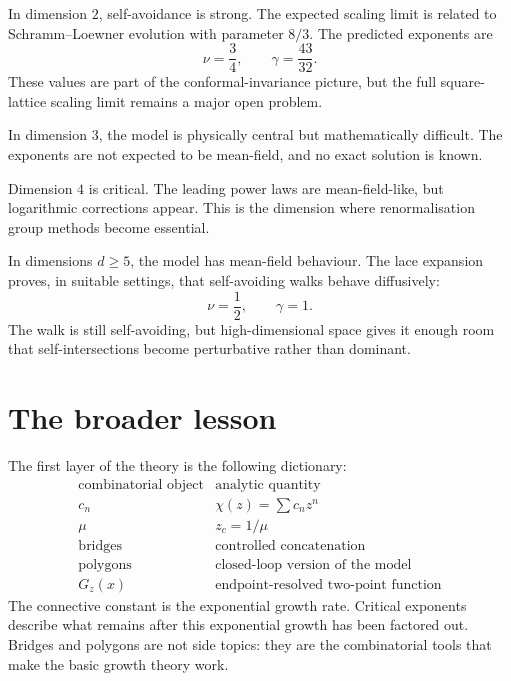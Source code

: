 In dimension \(2\), self-avoidance is strong.  The expected scaling limit is related to Schramm--Loewner evolution with parameter \(8/3\).  The predicted exponents are
\[
  \nu=\frac34,
  \qquad
  \gamma=\frac{43}{32}.
\]
These values are part of the conformal-invariance picture, but the full square-lattice scaling limit remains a major open problem.

In dimension \(3\), the model is physically central but mathematically difficult.  The exponents are not expected to be mean-field, and no exact solution is known.

Dimension \(4\) is critical.  The leading power laws are mean-field-like, but logarithmic corrections appear.  This is the dimension where renormalisation group methods become essential.

In dimensions \(d\ge5\), the model has mean-field behaviour.  The lace expansion proves, in suitable settings, that self-avoiding walks behave diffusively:
\[
  \nu=\frac12,
  \qquad
  \gamma=1.
\]
The walk is still self-avoiding, but high-dimensional space gives it enough room that self-intersections become perturbative rather than dominant.

\section{The broader lesson}

The first layer of the theory is the following dictionary:
\[
\begin{array}{c|c}
\text{combinatorial object} & \text{analytic quantity}\\
\hline
c_n & \chi(z)=\sum c_nz^n\\
\mu & z_c=1/\mu\\
\text{bridges} & \text{controlled concatenation}\\
\text{polygons} & \text{closed-loop version of the model}\\
G_z(x) & \text{endpoint-resolved two-point function}
\end{array}
\]
The connective constant is the exponential growth rate.  Critical exponents describe what remains after this exponential growth has been factored out.  Bridges and polygons are not side topics: they are the combinatorial tools that make the basic growth theory work.
